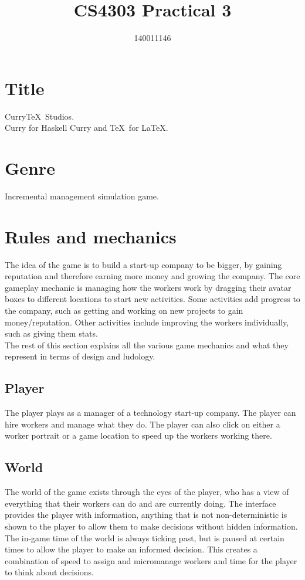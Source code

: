 \documentclass[11pt]{article}
\author{140011146}
\title{CS4303 Practical 3}
\newcommand{\n}[0]{\\[\baselineskip]}
\begin{document}
\maketitle



\section{Title}
Curry\TeX\ Studios.
\n
Curry for Haskell Curry and \TeX\ for \LaTeX.

\section{Genre}
Incremental management simulation game.


\section{Rules and mechanics}
The idea of the game is to build a start-up company to be bigger, by gaining reputation and therefore earning more money and growing the company. The core gameplay mechanic is managing how the workers work by dragging their avatar boxes to different locations to start new activities. Some activities add progress to the company, such as getting and working on new projects to gain money/reputation. Other activities include improving the workers individually, such as giving them stats. 
\n
The rest of this section explains all the various game mechanics and what they represent in terms of design and ludology.
\subsection{Player}
The player plays as a manager of a technology start-up company. The player can hire workers and manage what they do. The player can also click on either a worker portrait or a game location to speed up the workers working there. 

\subsection{World}
The world of the game exists through the eyes of the player, who has a view of everything that their workers can do and are currently doing. The interface provides the player with information, anything that is not non-deterministic is shown to the player to allow them to make decisions without hidden information. 
\n
The in-game time of the world is always ticking past, but is paused at certain times to allow the player to make an informed decision. This creates a combination of speed to assign and micromanage workers and time for the player to think about decisions. 
\end{document}
